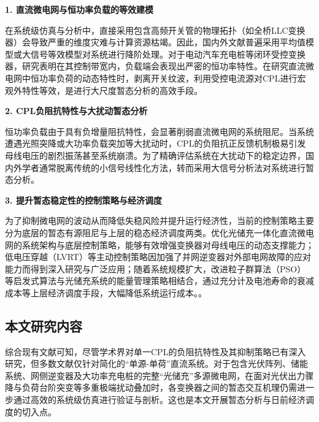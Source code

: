 \textbf{1. 直流微电网与恒功率负载的等效建模}

在系统级仿真与分析中，直接采用包含高频开关管的物理拓扑（如全桥LLC变换器）会导致严重的维度灾难与计算资源枯竭。因此，国内外文献普遍采用平均值模型或大信号等效模型对系统进行降阶处理。对于电动汽车充电桩等闭环受控变换器，研究表明在其控制带宽内，负载端会表现出严密的恒功率特性。在研究直流微电网中恒功率负荷的动态特性时，剥离开关纹波，利用受控电流源对CPL进行宏观外特性等效，是进行大尺度暂态分析的高效手段。

\textbf{2. CPL负阻抗特性与大扰动暂态分析}

恒功率负载由于具有负增量阻抗特性，会显著削弱直流微电网的系统阻尼。当系统遭遇光照突降或大功率负载突加等大扰动时，CPL的负阻抗正反馈机制极易引发母线电压的剧烈振荡甚至系统崩溃。为了精确评估系统在大扰动下的稳定边界，国内外学者通常脱离传统的小信号线性化方法，转而采用大信号分析法对系统进行暂态分析。

\textbf{3. 提升暂态稳定性的控制策略与经济调度}

为了抑制微电网的波动从而降低失稳风险并提升运行经济性，当前的控制策略主要分为底层的暂态有源阻尼与上层的稳态经济调度两类。优化光储充一体化直流微电网的系统架构与底层控制策略，能够有效增强变换器对母线电压的动态支撑能力；低电压穿越（LVRT）等主动控制策略因加强了并网逆变器对外部电网故障的应对能力而得到深入研究与广泛应用；随着系统规模扩大，改进粒子群算法（PSO）等启发式算法与光储充系统的能量管理策略相结合，通过充分计及电池寿命的衰减成本等上层经济调度手段，大幅降低系统运行成本。。

\subsection{本文研究内容}

综合现有文献可知，尽管学术界对单一CPL的负阻抗特性及其抑制策略已有深入研究，但多数文献仅针对简化的“单源-单荷”直流系统。对于包含光伏阵列、储能系统、网侧逆变器及大功率充电桩的完整“光储充”多源微电网，在面对光伏出力骤降与负荷台阶突变等多重极端扰动叠加时，各变换器之间的暂态交互机理仍需进一步通过高效的系统级仿真进行验证与剖析。这也是本文开展暂态分析与日前经济调度的切入点。
